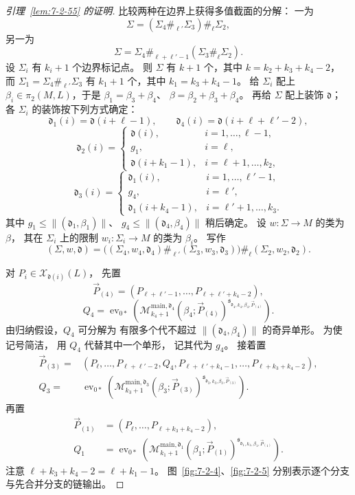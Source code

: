 \begin{proof}[引理~\ref{lem:7-2-55} 的证明]
比较两种在边界上获得多值截面的分解：
一为
\[
\Sigma=(\Sigma_4\mathbin{\#_{\ell'}}\Sigma_3)
\mathbin{\#_\ell}\Sigma_2,
\]
另一为
\[
\Sigma=\Sigma_4
\mathbin{\#_{\ell+\ell'-1}}
(\Sigma_3\mathbin{\#_\ell}\Sigma_2).
\]
设 $\Sigma_i$ 有 $k_i+1$ 个边界标记点。
则 $\Sigma$ 有 $k+1$ 个，其中
$k=k_2+k_3+k_4-2$，
而 $\Sigma_1=\Sigma_4\mathbin{\#_{\ell'}}\Sigma_3$
有 $k_1+1$ 个，其中 $k_1=k_3+k_4-1$。
给 $\Sigma_i$ 配上
$\beta_i\in\pi_2(M,L)$，于是
$\beta_1=\beta_3+\beta_4$、
$\beta=\beta_2+\beta_3+\beta_4$。
再给 $\Sigma$ 配上装饰 $\mathfrak d$；
各 $\Sigma_i$ 的装饰按下列方式确定：
\[
\mathfrak d_1(i)=\mathfrak d(i+\ell-1),
\qquad
\mathfrak d_4(i)=\mathfrak d(i+\ell+\ell'-2),
\]
\[
\mathfrak d_2(i)=
\begin{cases}
\mathfrak d(i),&i=1,\ldots,\ell-1,\\
g_1,&i=\ell,\\
\mathfrak d(i+k_1-1),&i=\ell+1,\ldots,k_2,
\end{cases}
\]
\[
\mathfrak d_3(i)=
\begin{cases}
\mathfrak d_1(i),&i=1,\ldots,\ell'-1,\\
g_4,&i=\ell',\\
\mathfrak d_1(i+k_4-1),&i=\ell'+1,\ldots,k_3.
\end{cases}
\]
其中 $g_1\le\|(\mathfrak d_1,\beta_1)\|$、
$g_4\le\|(\mathfrak d_4,\beta_4)\|$
稍后确定。
设 $w\colon\Sigma\to M$ 的类为 $\beta$，
其在 $\Sigma_i$ 上的限制
$w_i\colon\Sigma_i\to M$ 的类为 $\beta_i$。
写作
\begin{equation}
(\Sigma,w,\mathfrak d)
=\bigl(
(\Sigma_4,w_4,\mathfrak d_4)
\mathbin{\#_{\ell'}}
(\Sigma_3,w_3,\mathfrak d_3)
\bigr)
\mathbin{\#_\ell}
(\Sigma_2,w_2,\mathfrak d_2).
\tag{7.2.58}\label{eq:7-2-58}
\end{equation}

对 $P_i\in\mathcal X_{\mathfrak d(i)}(L)$，
先置
\[
\vec P_{(4)}
=(P_{\ell+\ell'-1},\ldots,
P_{\ell+\ell'+k_4-2}),
\]
\[
Q_4=\operatorname{ev}_{0*}\left(
\mathcal M^{\mathrm{main},\mathfrak d_4}_{k_4+1}
(\beta_4;\vec P_{(4)})
^{\mathfrak s_{\mathfrak d_4,k_4,\beta_4,\vec P_{(4)}}}
\right).
\]
由归纳假设，$Q_4$ 可分解为
有限多个代不超过
$\|(\mathfrak d_4,\beta_4)\|$
的奇异单形。
为使记号简洁，
用 $Q_4$ 代替其中一个单形，
记其代为 $g_4$。
接着置
\[
\begin{aligned}
\vec P_{(3)}
={}&(P_\ell,\ldots,P_{\ell+\ell'-2},Q_4,
P_{\ell+\ell'+k_4-1},\ldots,
P_{\ell+k_3+k_4-2}),\\
Q_3={}&\operatorname{ev}_{0*}\left(
\mathcal M^{\mathrm{main},\mathfrak d_3}_{k_3+1}
(\beta_3;\vec P_{(3)})
^{\mathfrak s_{\mathfrak d_3,k_3,\beta_3,\vec P_{(3)}}}
\right).
\end{aligned}
\]
再置
\[
\begin{aligned}
\vec P_{(1)}
&=(P_\ell,\ldots,P_{\ell+k_3+k_4-2}),\\
Q_1&=\operatorname{ev}_{0*}\left(
\mathcal M^{\mathrm{main},\mathfrak d_1}_{k_1+1}
(\beta_1;\vec P_{(1)})
^{\mathfrak s_{\mathfrak d_1,k_1,\beta_1,\vec P_{(1)}}}
\right).
\end{aligned}
\]
注意
$\ell+k_3+k_4-2=\ell+k_1-1$。
图~\ref{fig:7-2-4}、\ref{fig:7-2-5}
分别表示逐个分支与先合并分支的链输出。


\end{proof}
